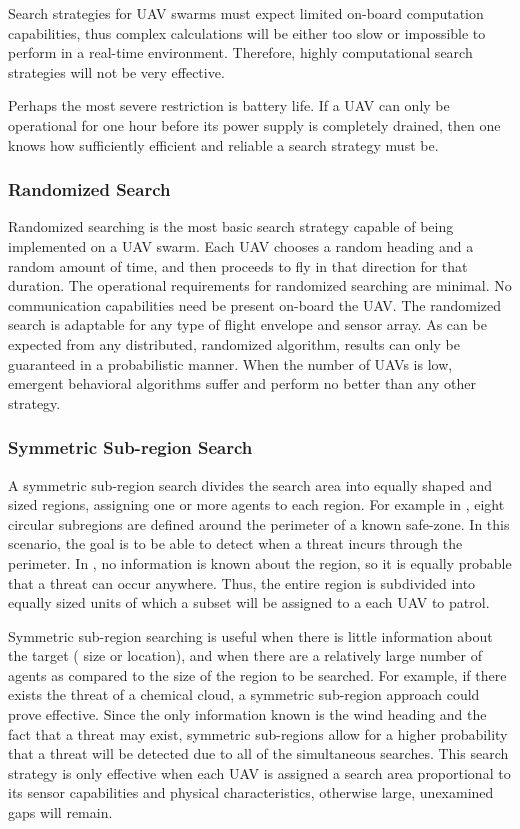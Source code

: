 Search strategies for UAV swarms must expect limited on-board computation capabilities, thus complex calculations will be either too slow or impossible to perform in a real-time environment. Therefore, highly computational search strategies will not be very effective.

Perhaps the most severe restriction is battery life. If a UAV can only be operational for one hour before its power supply is completely drained, then one knows how sufficiently efficient and reliable a search strategy must be. 

\subsubsection{Randomized Search} Randomized searching is the most basic search strategy capable of being implemented on a UAV swarm. Each UAV chooses a random heading and a random amount of time, and then proceeds to fly in that direction for that duration. The operational requirements for randomized searching are minimal. No communication capabilities need be present on-board the UAV. The randomized search is adaptable for any type of flight envelope and sensor array. As can be expected from any distributed, randomized algorithm, results can only be guaranteed in a probabilistic manner. When the number of UAVs is low, emergent behavioral algorithms suffer and perform no better than any other strategy. 

\subsubsection{Symmetric Sub-region Search} A symmetric sub-region search divides the search area into equally shaped and sized regions, assigning one or more agents to each region. For example in , eight circular subregions are defined around the perimeter of a known safe-zone.  In this scenario, the goal is to be able to detect when a threat incurs through the perimeter.  In , no information is known about the region, so it is equally probable that a threat can occur anywhere.  Thus, the entire region is subdivided into equally sized units of which a subset will be assigned to a each UAV to patrol.  

Symmetric sub-region searching is useful when there is little \apriori{} information about the target (\ie{} size or location), and when there are a relatively large number of agents as compared to the size of the region to be searched. For example, if there exists the threat of a chemical cloud, a symmetric sub-region approach could prove effective. Since the only information known is the wind heading and the fact that a threat may exist, symmetric sub-regions allow for a higher probability that a threat will be detected due to all of the simultaneous searches. This search strategy is only effective when each UAV is assigned a search area proportional to its sensor capabilities and physical characteristics, otherwise large, unexamined gaps will remain.

